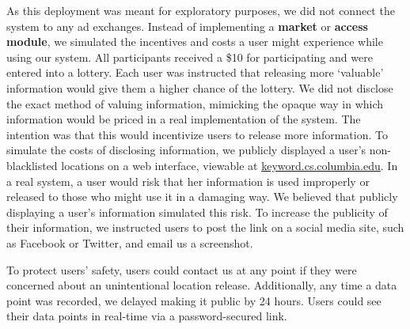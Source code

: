 As this deployment was meant for exploratory purposes, we did not connect the system to any ad exchanges.
Instead of implementing a \textbf{market} or \textbf{access module},
we simulated the incentives and costs a user might experience while using our system. 
All participants received a \$10 for participating and were entered into a lottery.
Each user was instructed that releasing more `valuable' information would give them a higher chance of the lottery.
We did not disclose the exact method of valuing information, mimicking the opaque way in which information would be priced in a real implementation of the system. The intention was that this would incentivize users to release more information.
To simulate the costs of disclosing information, we publicly displayed a user's non-blacklisted locations on a web interface,
 viewable at \url{keyword.cs.columbia.edu}. 
In a real system, a user would risk that her information is used improperly or released to those who might use it in a damaging way.
We believed that publicly displaying a user's information simulated this risk. 
To increase the publicity of their information, we instructed users to post the link on a social media site, such as Facebook or Twitter, and email us a screenshot.

To protect users' safety, users could contact us at any point if they were concerned about an unintentional location release. Additionally, any time a data point was recorded, we delayed making it public by 24 hours. Users could see their data points in real-time via a password-secured link.



